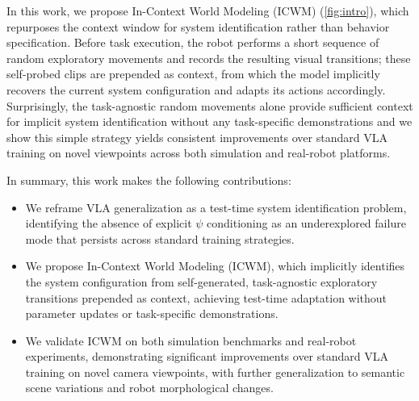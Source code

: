 In this work, we propose In-Context World Modeling (ICWM) (\autoref{fig:intro}), which repurposes the context window for system 
identification rather than behavior specification. Before task execution, the robot performs a short sequence of random exploratory movements and records the resulting visual transitions; these self-probed clips are prepended as context, from which the model implicitly recovers the current system configuration and adapts its actions accordingly. 
Surprisingly, the task-agnostic random movements alone provide sufficient context for implicit system identification without any task-specific demonstrations and we show this simple strategy yields consistent improvements over standard VLA training on novel viewpoints across both simulation and real-robot platforms.



In summary, this work makes the following contributions:
\begin{itemize}
    \item We reframe VLA generalization as a test-time system identification problem, identifying the absence of explicit $\psi$ conditioning as an underexplored failure mode that persists across standard training strategies.
    \item We propose In-Context World Modeling (ICWM), which implicitly identifies the system configuration from self-generated, task-agnostic exploratory transitions prepended as context, achieving test-time adaptation without parameter updates or task-specific demonstrations.
    \item We validate ICWM on both simulation benchmarks and real-robot experiments, demonstrating significant improvements over standard VLA training on novel camera viewpoints, with further generalization to semantic scene variations and robot morphological changes.
\end{itemize}

